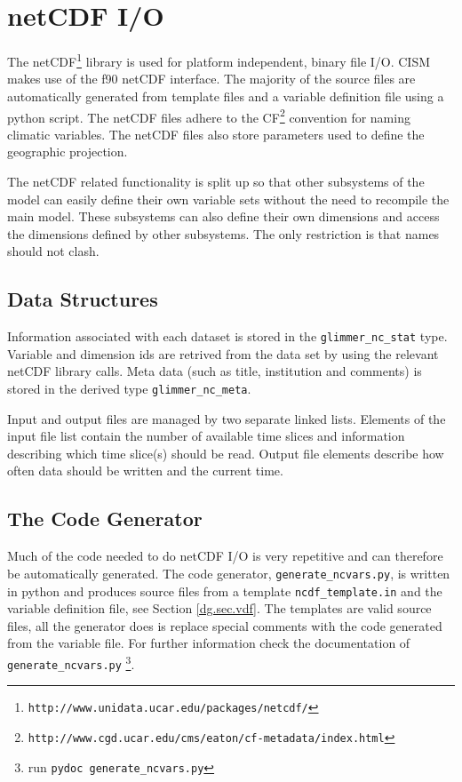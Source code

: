 \section{netCDF I/O}
\label{app:netcdfio}
The netCDF\footnote{\texttt{http://www.unidata.ucar.edu/packages/netcdf/}} library 
is used for platform independent, binary file I/O. CISM makes use of the f90 netCDF interface. 
The majority of the source files are automatically generated from template files and 
a variable definition file using a python script. The netCDF files adhere to the 
CF\footnote{\texttt{http://www.cgd.ucar.edu/cms/eaton/cf-metadata/index.html}} 
convention for naming climatic variables. The netCDF files also store parameters used to define the geographic projection.

The netCDF related functionality is split up so that other subsystems of the model 
can easily define their own variable sets without the need to recompile the main model. 
These subsystems can also define their own dimensions and access the dimensions 
defined by other subsystems. The only restriction is that names should not clash. 

\subsection{Data Structures}
Information associated with each dataset is stored in the \texttt{glimmer\_nc\_stat} type. Variable and dimension ids are retrived from the data set by using the relevant netCDF library calls. Meta data (such as title, institution and comments) is stored in the derived type \texttt{glimmer\_nc\_meta}.

Input and output files are managed by two separate linked lists. Elements of the input file list contain the number of available time slices and information describing which time slice(s) should be read. Output file elements describe how often data should be written and the current time.

\subsection{The Code Generator}
Much of the code needed to do netCDF I/O is very repetitive and can therefore 
be automatically generated. The code generator, \texttt{generate\_ncvars.py}, 
is written in python and produces source files from a template \texttt{ncdf\_template.in} 
and the variable definition file, see Section \ref{dg.sec.vdf}. The templates are 
valid source files, all the generator does is replace special comments with 
the code generated from the variable file. For further information check 
the documentation of \texttt{generate\_ncvars.py}
\footnote{run \texttt{pydoc generate\_ncvars.py}}. 

